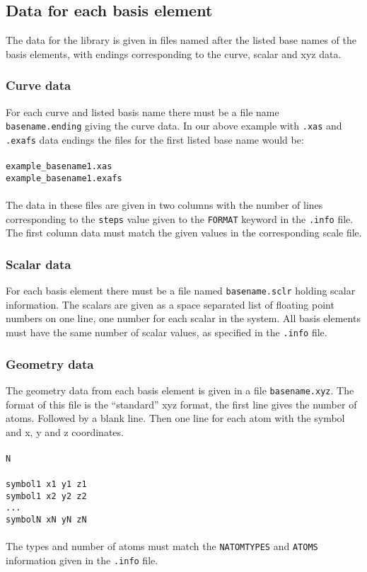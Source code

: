 \documentclass[a4paper, 10pt]{article}
\begin{document}
\subsection{Data for each basis element}

The data for the library is given in files named after the listed
base names of the basis elements, with endings corresponding to the
curve, scalar and xyz data.

\subsubsection{Curve data}
For each curve and listed basis name there must be a file name {\tt
  basename.ending} giving the curve data. In our above example with
{\tt .xas} and {\tt .exafs} data endings the files for the first
listed base name would be:\\\\
{\tt example\_basename1.xas}\\
{\tt example\_basename1.exafs}\\\\
The data in these files are given in two columns with the number of
lines corresponding to the {\tt steps} value given to the {\tt FORMAT}
keyword in the {\tt .info} file. The first column data must match the
given values in the corresponding scale file.

\subsubsection{Scalar data}
For each basis element there must be a file named
{\tt basename.sclr} holding scalar information. The scalars are given
as a space separated list of floating point numbers on one line, one
number for each scalar in the system. All basis elements must have the
same number of scalar values, as specified in the {\tt .info} file.

\subsubsection{Geometry data}
The geometry data from each basis element is
given in a file {\tt basename.xyz}. The format of this file is the
``standard'' xyz format, the first line gives the number of
atoms. Followed by a blank line. Then one line for each atom with the
symbol and x, y and z coordinates.\\\\
{\tt N}\\\\
{\tt symbol1 x1 y1 z1}\\
{\tt symbol1 x2 y2 z2}\\
{\tt ... }\\
{\tt symbolN xN yN zN}\\\\
The types and number of atoms must match the {\tt NATOMTYPES} and {\tt ATOMS}
information given in the {\tt .info} file.
\end{document}
